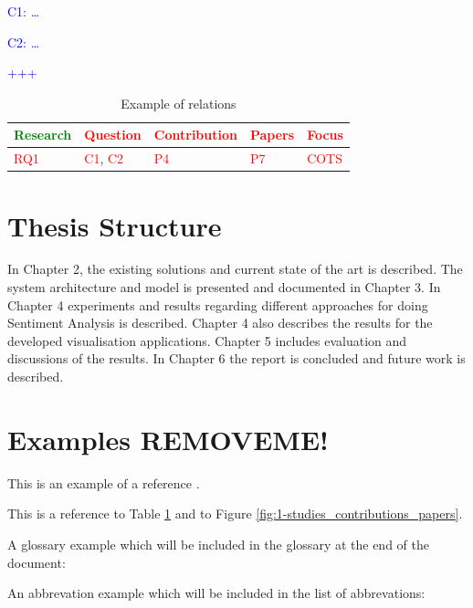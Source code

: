 \textcolor{blue}{C1: \ldots}

\textcolor{blue}{C2: \ldots}

\textcolor{blue}{+++}


\begin{table}[!h]
\centering
\begin{tabular}{|l|l|l|l|l|} 
\hline
\textcolor{green}{Research} & \textcolor{red}{Question} & \textcolor{red}{Contribution} & \textcolor{red}{Papers} & \textcolor{red}{Focus} \\
\hline
\textcolor{red}{RQ1} & \textcolor{red}{C1}, \textcolor{red}{C2} & \textcolor{red}{P4} & \textcolor{red}{P7} & \textcolor{red}{COTS} \\
\hline

\end{tabular}
\caption{Example of relations}
\label{tab:1-relations}
\end{table}


\section{Thesis Structure}
\label{sec:structure}

In Chapter 2, the existing solutions and current state of the art is described. The system architecture and model is presented and documented in Chapter 3. In Chapter 4 experiments and results regarding different approaches for doing Sentiment Analysis is described. Chapter 4 also describes the results for the developed visualisation applications. Chapter 5 includes evaluation and discussions of the results. In Chapter 6 the report is concluded and future work is described. 



\section{Examples REMOVEME!}

This is an example of a reference \cite{copland2000}.

This is a reference to Table \ref{tab:1-relations} and to Figure \ref{fig:1-studies_contributions_papers}.

A glossary example which will be included in the glossary at the end of the document:

An abbrevation example which will be included in the list of abbrevations: 

